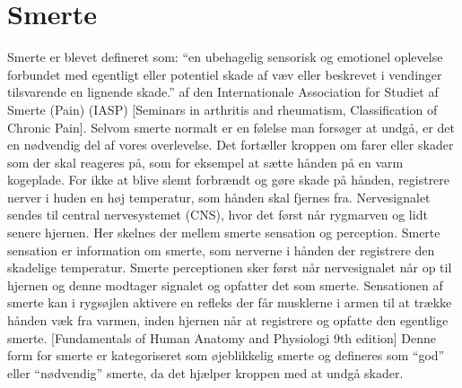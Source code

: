 \section{Smerte}

Smerte er blevet defineret som: “en ubehagelig sensorisk og emotionel oplevelse forbundet med egentligt eller potentiel skade af væv eller beskrevet i vendinger tilsvarende en lignende skade.” af den Internationale Association for Studiet af Smerte (Pain) (IASP) [Seminars in arthritis and rheumatism, Classification of Chronic Pain]. 
Selvom smerte normalt er en følelse man forsøger at undgå, er det en nødvendig del af vores overlevelse. Det fortæller kroppen om farer eller skader som der skal reageres på, som for eksempel at sætte hånden på en varm kogeplade. For ikke at blive slemt forbrændt og gøre skade på hånden, registrere nerver i huden en høj temperatur, som hånden skal fjernes fra. Nervesignalet sendes til central nervesystemet (CNS), hvor det først når rygmarven og lidt senere hjernen. Her skelnes der mellem smerte sensation og perception. Smerte sensation er information om smerte, som nerverne i hånden der registrere den skadelige temperatur. Smerte perceptionen sker først når nervesignalet når op til hjernen og denne modtager signalet og opfatter det som smerte. Sensationen af smerte kan i rygsøjlen aktivere en refleks der får musklerne i armen til at trække hånden væk fra varmen, inden hjernen når at registrere og opfatte den egentlige smerte. [Fundamentals of Human Anatomy and Physiologi 9th edition] Denne form for smerte er kategoriseret som øjeblikkelig smerte og defineres som “god” eller “nødvendig” smerte, da det hjælper kroppen med at undgå skader.

